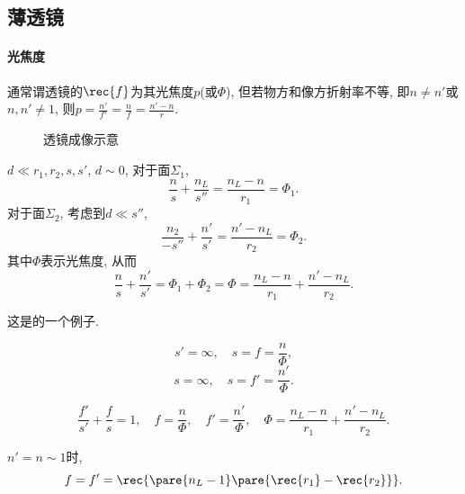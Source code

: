 \documentclass{ctexart}
\begin{document}

\subsection{薄透镜} %
\label{sub:薄透镜}

\paragraph{光焦度} %
\label{par:光焦度}

通常谓透镜的$\displaystyle\rec{f}$为其光焦度$p$(或$\Phi$), 但若物方和像方折射率不等, 即$n\neq n'$或$n,n'\neq 1$, 则$\displaystyle p = \frac{n'}{f'} = \frac{n}{f} = \frac{n'-n}{r}$.


\begin{figure}[ht]
    \centering
    \caption{透镜成像示意}
    \label{fig:透镜成像示意}
\end{figure}
$d\ll r_1,r_2,s,s'$, $d\sim 0$, 对于面$\Sigma_1$,\\
\[ \frac{n}{s} + \frac{n_L}{s''} = \frac{n_L - n}{r_1} = \Phi_1. \]
对于面$\Sigma_2$, 考虑到$d \ll s''$,
\[ \frac{n_2}{-s''} + \frac{n'}{s'} = \frac{n'-n_L}{r_2} = \Phi_2. \]
其中$\Phi$表示光焦度, 从而
\[ \frac{n}{s} + \frac{n'}{s'} = \Phi_1 + \Phi_2 = \Phi = \frac{n_L - n}{r_1} + \frac{n'-n_L}{r_2}. \]
\begin{remark}
    这是的一个例子.
\end{remark}
\[ s' = \infty,\quad s = f = \frac{n}{\Phi}, \]
\[ s = \infty, \quad s = f' = \frac{n'}{\Phi}. \]
\begin{finale}
    \begin{theorem}
        \begin{equation}
            \label{eq:Gauss物像公式}
            \frac{f'}{s'} + \frac{f}{s} = 1,\quad f = \frac{n}{\Phi},\quad f' = \frac{n'}{\Phi},\quad \Phi = \frac{n_L-n}{r_1} + \frac{n'-n_L}{r_2}. 
        \end{equation}
    \end{theorem}
\end{finale}
\begin{finale}
    \begin{theorem}[磨镜者公式]$n'=n\sim 1$时,
        \[ f = f' = \rec{\pare{n_L-1}\pare{\rec{r_1} - \rec{r_2}}}. \]
    \end{theorem}
\end{finale}
\end{document}
